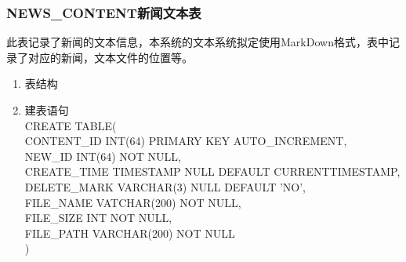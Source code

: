 \subsubsection{NEWS\_CONTENT新闻文本表}
此表记录了新闻的文本信息，本系统的文本系统拟定使用MarkDown格式，表中记录了对应的新闻，文本文件的位置等。
\begin{enumerate}
    \item 表结构
    \begin{table}[htbp]
        \centering
        \end{table}
    \item 建表语句\\
        CREATE TABLE(\\
            CONTENT\_ID INT(64) PRIMARY KEY AUTO\_INCREMENT,\\
            NEW\_ID INT(64) NOT NULL,\\
            CREATE\_TIME TIMESTAMP NULL DEFAULT CURRENTTIMESTAMP,\\
            DELETE\_MARK VARCHAR(3) NULL DEFAULT 'NO',\\
            FILE\_NAME VATCHAR(200) NOT NULL,\\
            FILE\_SIZE INT NOT NULL,\\
            FILE\_PATH VARCHAR(200) NOT NULL\\
        )
    \end{enumerate}

